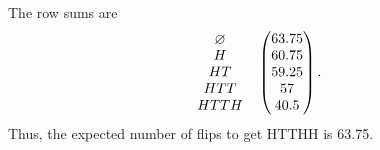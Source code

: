 \documentclass{article}
\begin{document}
The row sums are
\begin{align*}
    \begin{matrix}
     \o &\\ H &\\ HT &\\ HTT &\\ HTTH
    \end{matrix}
    \begin{pmatrix}
    63.75\\
    60.75\\
    59.25\\
    57\\
    40.5
    \end{pmatrix}.
\end{align*}
Thus, the expected number of flips to get HTTHH is 63.75.
\end{document}
